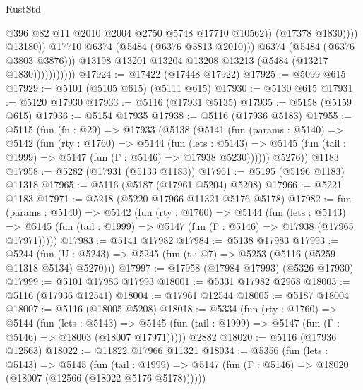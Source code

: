 \begin{lexlean}{RustStd}
\begin{coremodule}
{\begin{coremodule}
{{{{{{{{{{{{{{{{{{{{{{{{{{{{{{{                                        @396
                                        @82
                                        @11
                                        @2010
                                        @2004
                                        @2750
                                        @5748
                                        @17710
                                        @10562))
                                    (@17378 @1830))))
                              @13180))
                          @17710
                          @6374
                          (@5484 (@6376 @3813 @2010)))
                        @6374
                        (@5484 (@6376 @3803 @3876)))
                      @13198
                      @13201
                      @13204
                      @13208
                      @13213
                      (@5484 (@13217 @1830)))))))))))
@17924 := @17422 (@17448 @17922)
@17925 := @5099 @615
@17929 := @5101 (@5105 @615) (@5111 @615)
@17930 := @5130 @615
@17931 := @5120 @17930
@17933 := @5116 (@17931 @5135)
@17935 := @5158 (@5159 @615)
@17936 := @5154 @17935
@17938 := @5116 (@17936 @5183)
@17955 := @5115
    (fun (fn : @29) =>
    @17933
      (@5138
        (@5141
          (fun (params : @5140) =>
          @5142
            (fun (rty : @1760) =>
            @5144
              (fun (lets : @5143) =>
              @5145 (fun (tail : @1999) => @5147 (fun (Γ : @5146) => @17938 @5230))))))
        @5276))
    @1183
@17958 := @5282 (@17931 (@5133 @1183))
@17961 := @5195 (@5196 @1183) @11318
@17965 := @5116 (@5187 (@17961 @5204) @5208)
@17966 := @5221 @1183
@17971 := @5218 (@5220 @17966 @11321 @5176 @5178)
@17982 := fun (params : @5140) =>
  @5142
    (fun (rty : @1760) =>
    @5144
      (fun (lets : @5143) =>
      @5145 (fun (tail : @1999) => @5147 (fun (Γ : @5146) => @17938 (@17965 @17971)))))
@17983 := @5141 @17982
@17984 := @5138 @17983
@17993 := @5244
    (fun (U : @5243) => @5245 (fun (t : @7) => @5253 (@5116 (@5259 @11318 @5134) @5270)))
@17997 := @17958 (@17984 @17993) (@5326 @17930)
@17999 := @5101 @17983 @17993
@18001 := @5331 @17982 @2968
@18003 := @5116 (@17936 @12541)
@18004 := @17961 @12544
@18005 := @5187 @18004
@18007 := @5116 (@18005 @5208)
@18018 := @5334
    (fun (rty : @1760) =>
    @5144
      (fun (lets : @5143) =>
      @5145 (fun (tail : @1999) => @5147 (fun (Γ : @5146) => @18003 (@18007 @17971)))))
    @2882
@18020 := @5116 (@17936 @12563)
@18022 := @11822 @17966 @11321
@18034 := @5356
    (fun (lets : @5143) =>
    @5145
      (fun (tail : @1999) =>
      @5147 (fun (Γ : @5146) => @18020 (@18007 (@12566 (@18022 @5176 @5178))))))
}}}}}}}}}}}}}}}}}}}}}}}}}}}}}}}
\end{coremodule}}
\end{coremodule}
\end{lexlean}
